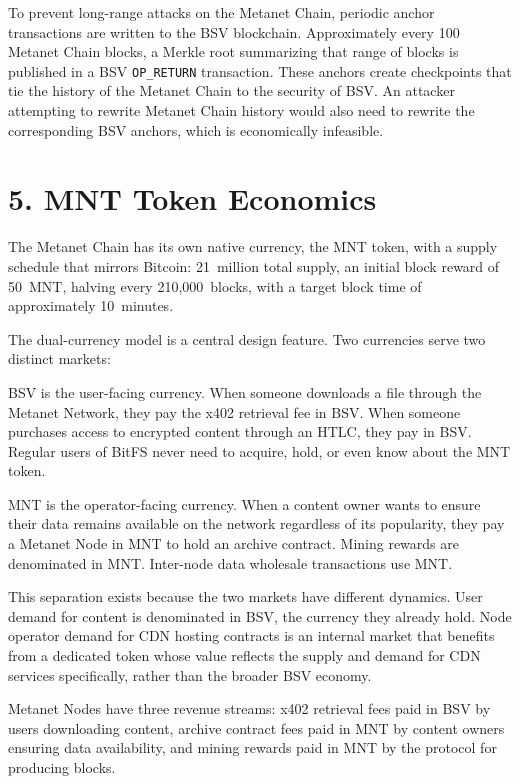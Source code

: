 \documentclass[11pt,a4paper]{article}
\begin{document}
To prevent long-range attacks on the Metanet Chain, periodic anchor transactions are written to the BSV blockchain. Approximately every 100 Metanet Chain blocks, a Merkle root summarizing that range of blocks is published in a BSV \texttt{OP\_RETURN} transaction. These anchors create checkpoints that tie the history of the Metanet Chain to the security of BSV. An attacker attempting to rewrite Metanet Chain history would also need to rewrite the corresponding BSV anchors, which is economically infeasible.

\section{5. MNT Token Economics}

The Metanet Chain has its own native currency, the MNT token, with a supply schedule that mirrors Bitcoin: 21~million total supply, an initial block reward of 50~MNT, halving every 210,000~blocks, with a target block time of approximately 10~minutes.

The dual-currency model is a central design feature. Two currencies serve two distinct markets:

BSV is the user-facing currency. When someone downloads a file through the Metanet Network, they pay the x402 retrieval fee in BSV. When someone purchases access to encrypted content through an HTLC, they pay in BSV. Regular users of BitFS never need to acquire, hold, or even know about the MNT token.

MNT is the operator-facing currency. When a content owner wants to ensure their data remains available on the network regardless of its popularity, they pay a Metanet Node in MNT to hold an archive contract. Mining rewards are denominated in MNT. Inter-node data wholesale transactions use MNT.

This separation exists because the two markets have different dynamics. User demand for content is denominated in BSV, the currency they already hold. Node operator demand for CDN hosting contracts is an internal market that benefits from a dedicated token whose value reflects the supply and demand for CDN services specifically, rather than the broader BSV economy.

Metanet Nodes have three revenue streams: x402 retrieval fees paid in BSV by users downloading content, archive contract fees paid in MNT by content owners ensuring data availability, and mining rewards paid in MNT by the protocol for producing blocks.
\end{document}
